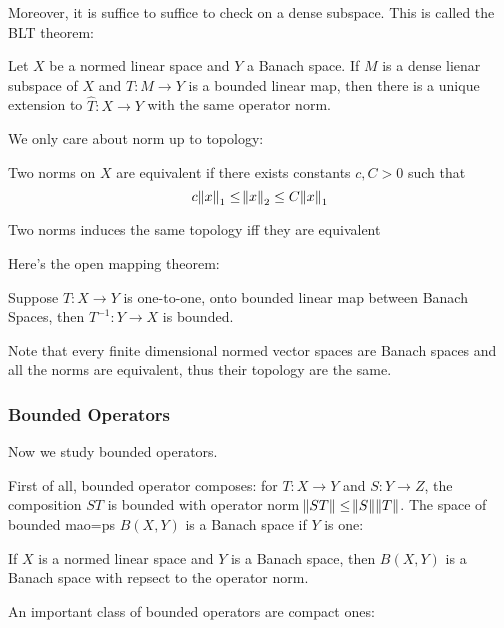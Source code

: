\documentclass[main.tex]{subfiles}
\begin{document}
Moreover, it is suffice to suffice to check on a dense subspace. This is called the BLT theorem:

\begin{theorem}
Let $X$ be a normed linear space and $Y$ a Banach space. If $M$ is a dense lienar subspace of $X$ and $T: M \rightarrow Y$ is a bounded linear map, then there is a unique extension to $\hat{T}: X \rightarrow Y$ with the same operator norm.
\end{theorem}

We only care about norm up to topology:

\begin{definition}
Two norms on $X$ are equivalent if there exists constants $c , C > 0$ such that 
$$
c\norm{x}_1 \leq \norm{x}_2 \leq C\norm{x}_1
$$
\end{definition}

\begin{theorem}
Two norms induces the same topology iff they are equivalent
\end{theorem}

Here's the open mapping theorem:

\begin{theorem}
Suppose $T: X \rightarrow Y$ is one-to-one, onto bounded linear map between Banach Spaces, then $T^{-1} : Y \rightarrow X$ is bounded.
\end{theorem}


Note that every finite dimensional normed vector spaces are Banach spaces and all the norms are equivalent, thus their topology are the same.

\subsubsection{Bounded Operators}
Now we study bounded operators. 

First of all, bounded operator composes: for $T: X \rightarrow Y$ and $S: Y \rightarrow Z$, the composition $ST$ is bounded with operator norm $\norm{ST} \leq \norm{S}\norm{T}$. 
The space of bounded mao=ps $B(X,Y)$ is a Banach space if $Y$ is one:
\begin{theorem}
If $X$ is a normed linear space and $Y$ is a Banach space, then $B(X,Y)$ is a Banach space with repsect to the operator norm.
\end{theorem}

An important class of bounded operators are compact ones:
\end{document}
